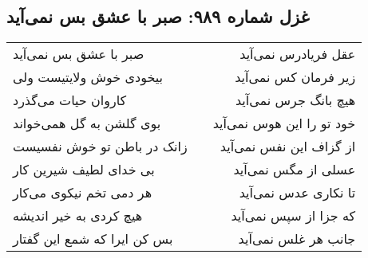 \begin{center}
\section*{غزل شماره ۹۸۹: صبر با عشق بس نمی‌آید}
\label{sec:0989}
\begin{longtable}{l p{0.5cm} r}
صبر با عشق بس نمی‌آید
&&
عقل فریادرس نمی‌آید
\\
بیخودی خوش ولایتیست ولی
&&
زیر فرمان کس نمی‌آید
\\
کاروان حیات می‌گذرد
&&
هیچ بانگ جرس نمی‌آید
\\
بوی گلشن به گل همی‌خواند
&&
خود تو را این هوس نمی‌آید
\\
زانک در باطن تو خوش نفسیست
&&
از گزاف این نفس نمی‌آید
\\
بی خدای لطیف شیرین کار
&&
عسلی از مگس نمی‌آید
\\
هر دمی تخم نیکوی می‌کار
&&
تا نکاری عدس نمی‌آید
\\
هیچ کردی به خیر اندیشه
&&
که جزا از سپس نمی‌آید
\\
بس کن ایرا که شمع این گفتار
&&
جانب هر غلس نمی‌آید
\\
\end{longtable}
\end{center}
